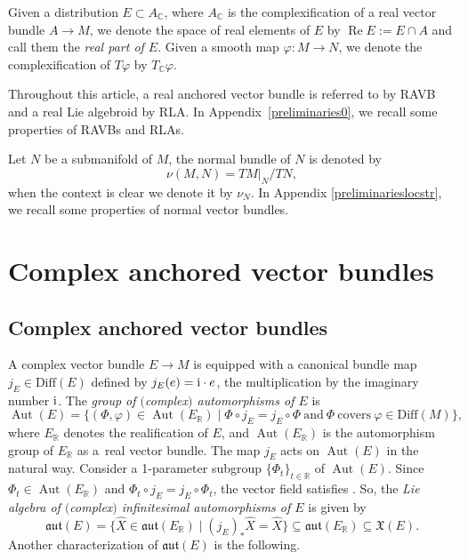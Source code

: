 \documentclass[pdftex]{sigma}
\numberwithin{equation}{section}
\newcommand{\R}{{\mathbb{R}}}
\newcommand{\C}{{\mathbb{C}}}
\newcommand{\Diff}{\mathrm{Diff}}
\newcommand{\aut}{\mathfrak{aut}}
\DeclareMathOperator{\Aut}{Aut}
\DeclareMathOperator{\re}{Re}
\begin{document}
Given a distribution $E\subset A_\C$, where $A_{\C}$ is the complexification of a real vector bundle $A\to M$, we denote the space of real elements of $E$ by $\re E:=E\cap A$ and call them the {\em real part of $E$}. Given a smooth map $\varphi\colon M\to N$, we denote the complexification of $T\varphi$ by $T_{\C}\varphi$.

Throughout this article, a real anchored vector bundle is referred to by RAVB and a real Lie algebroid by RLA. In Appendix~\ref{preliminaries0}, we recall some properties of RAVBs and RLAs.

Let $N$ be a submanifold of $M$, the normal bundle of $N$ is denoted by
\[
\nu(M,N)=TM|_{N}/TN,
\]
when the context is clear we denote it by $\nu_N$. In Appendix \ref{preliminarieslocstr}, we recall some properties of normal vector bundles.

\section{Complex anchored vector bundles}\label{CAVB}
\subsection{Complex anchored vector bundles}
A complex vector bundle $E\to M$ is equipped with a canonical bundle map $j_E\in \Diff(E)$ defined by $j_E(e)={\rm i}\cdot e$, the multiplication by the imaginary number ${\rm i}$. The {\em group of $($complex$)$ automorphisms of $E$} is
 \[
 \Aut(E)=\{(\Phi,\varphi)\in \Aut(E_{\R})\mid \Phi\circ j_E=j_E \circ \Phi\ \text{and}\ \Phi\ \text{covers}\ \varphi\in \Diff(M)\},
 \]
 where $E_{\R}$ denotes the realification of $E$, and $\Aut(E_{\R})$ is the automorphism group of $E_{\R}$ as a~real vector bundle.
The map $j_E$ acts on $\Aut(E)$ in the natural way. Consider a 1-parameter subgroup $\{\Phi_t\}_{t\in \R}$ of $\Aut(E)$. Since $\Phi_t\in \Aut(E_{\R})$ and $\Phi_t\circ j_E=j_E\circ \Phi_t$, the vector field \smash{$\hat{X}=\frac{{\rm d}}{{\rm d}t}\Phi_t|_{t=0}\in \mathfrak{aut}(E_{\R})$} satisfies . So, the {\em Lie algebra of $($complex$)$ infinitesimal automorphisms of $E$} is given by
 \[\mathfrak{aut}(E)=\bigl\{\hat{X}\in \mathfrak{aut}(E_{\R})\mid (j_E)_* \hat{X}=\hat{X}\bigr\}\subseteq \mathfrak{aut}(E_{\R})\subseteq \mathfrak{X}(E).\]
 Another characterization of $\aut(E)$ is the following.
\end{document}
